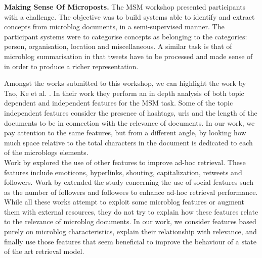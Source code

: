 
\noindent \textbf{Making Sense Of Microposts.} The MSM workshop \cite{basave2013making} presented participants with a challenge. The objective was to build systems able to identify and extract concepts from microblog documents, in a semi-supervised manner. The participant systems were to categorise concepts as belonging to the categories: person, organisation, location and miscellaneous. A similar task is that of microblog summarisation \cite{5590862} in that tweets have to be processed and made sense of in order to produce a richer representation.

Amongst the works submitted to this workshop, we can highlight the work by Tao, Ke et al. \cite{tao2012makes}. In their work they perform an in depth analysis of both topic dependent and independent features for the MSM task. Some of the topic independent features consider the presence of hashtags, urls and the length of the documents to be in connection with the relevance of documents. In our work, we pay attention to the same features, but from a different angle, by looking how much space relative to the total characters in the document is dedicated to each of the microblogs elements. \\




Work by \cite{massoudi2011incorporating} explored the use of other features to improve ad-hoc retrieval. These features include emoticons, hyperlinks, shouting, capitalization, retweets and followers. 
Work by \cite{nagmoti2010ranking} extended the study concerning the use of social features such as the number of followers and followees to enhance ad-hoc retrieval performance.
While all these works attempt to exploit some microblog features or augment them with external resources, they do not try to explain how these features relate to the relevance of microblog documents. In our work, we consider features based purely on microblog characteristics, explain their relationship with relevance, and finally use those features that seem beneficial to improve the behaviour of a state of the art retrieval model.
